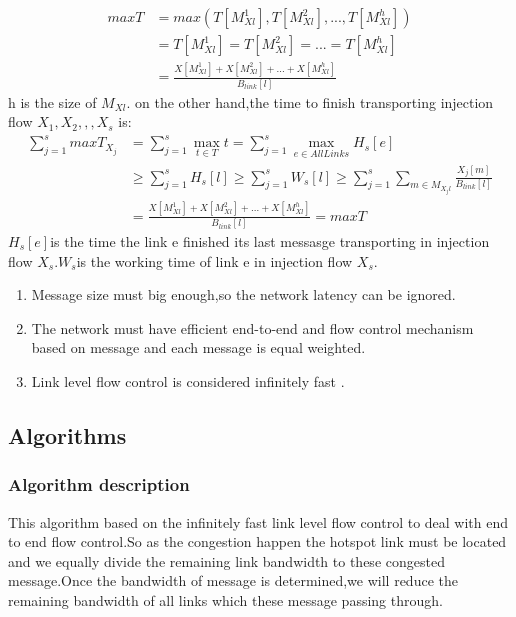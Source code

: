 \documentclass[UTF8,a4paper, 12pt]{ctexart}
\begin{document}
\begin{equation}
\begin{aligned}
maxT & = max(T[M_{Xl}^1] , T[M_{Xl}^2] , ... , T[M_{Xl}^h]) \\
&  = T[M_{Xl}^1] = T[M_{Xl}^2] = ... = T[M_{Xl}^h] \\
 	& =   \frac  {X[M_{Xl}^1] + X[M_{Xl}^2] + ... + X[M_{Xl}^h]}{B_{link}[l]}
\end{aligned}
\end{equation}
 h is the size of $M_{Xl}$. on the other hand,the time to finish transporting injection flow $X_1,X_2,,,X_s$ is:
\begin{equation}
\begin{aligned}
\sum_{j = 1}^{s} maxT_{X_j} &  = \sum_{j = 1}^{s}  \max _{t \in T} t = \sum_{j = 1}^{s} \max_{e \in AllLinks} H_s[e] \\
& \geq  \sum_{j = 1}^{s} H_s[l] \geq \sum_{j = 1}^{s} W_s[l] \geq \sum_{j = 1}^{s} \sum_{m \in M_{X_jl}} \frac{X_j[m]}{B_{link}[l]} \\
&  = \frac {X[M_{Xl}^1] + X[M_{Xl}^2] + ... + X[M_{Xl}^h]}{B_{link}[l]} =maxT 
\end{aligned}
\end{equation}   
$H_s[e]$is the time the link e finished its last messasge transporting in injection flow $X_s$.$W_s$is the working time of link e in injection flow $X_s$.


\begin{enumerate}[label=(\roman*)]
	\item Message size must big enough,so the network latency can be ignored.
	\item The network must have efficient end-to-end and flow control mechanism based on message and each message is equal weighted.
	\item Link level flow control is considered infinitely fast  .
\end{enumerate}


\subsection{Algorithms}
\subsubsection{Algorithm description}
This algorithm  based on the infinitely fast link level flow control to deal with end to end flow control.So as the congestion happen the hotspot link must be located and we equally divide the remaining link bandwidth to these congested message.Once the bandwidth of message is determined,we will reduce the remaining bandwidth of all links which these message passing through.   
\end{document}
